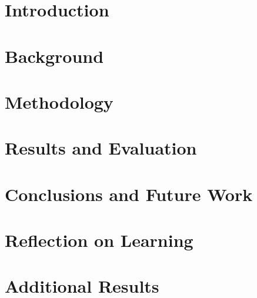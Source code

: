 \mainmatter

\chapter{Introduction}\label{ch1}


\chapter{Background}\label{ch2}


\chapter{Methodology}\label{ch3}


\chapter{Results and Evaluation}\label{ch4}


\chapter{Conclusions and Future Work}\label{ch5}


\chapter{Reflection on Learning}\label{ch6}


\backmatter

\appendix
% 

\chapter{Additional Results}\label{app:results}




